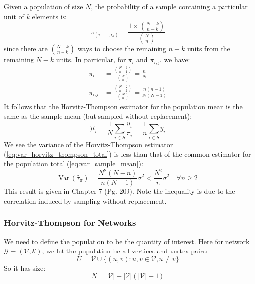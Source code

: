\documentclass{article}
\begin{document}
\begin{example}\label{ex:srs}
   Given a population of size $N$, the probability of a sample containing a particular unit of $k$ elements is:
    \begin{equation*}
        \pi_{(i_1, \ldots, i_k)} = \frac{1 \times \binom{N-k}{n-k}}{\binom{N}{n}}
    \end{equation*}
    since there are $\binom{N-k}{n-k}$ ways to choose the remaining $n-k$ units from the remaining $N-k$ units.  
    In particular, for $\pi_i$ and $\pi_{i,j}$, we have:
    \begin{align*}
        \pi_i &= \frac{\binom{N-1}{n-1}}{\binom{N}{n}} = \frac{n}{N}\\
        \pi_{i,j} &= \frac{\binom{N-2}{n-2}}{\binom{N}{n}} = \frac{n(n-1)}{N(N-1)}
    \end{align*}
    It follows that the Horvitz-Thompson estimator for the population mean is the same as the sample mean (but sampled without replacement):
    \begin{equation*}
        \hat{\mu}_{\pi} = \frac{1}{N}\sum_{i\in S} \frac{y_i}{\pi_i} = \frac{1}{n}\sum_{i\in S} y_i
    \end{equation*}
    We see the variance of the Horvitz-Thompson estimator (\ref{eq:var_horvitz_thompson_total}) is less than that of the common estimator for the population total (\ref{eq:var_sample_mean}):
    \begin{equation*}
        \mathrm{Var}\,(\hat{\tau}_{\pi})=\frac{N^{2}(N-n)}{n(N-1)}\sigma^{2}<\frac{N^{2}}{n}\sigma^{2} \quad \forall n \geq 2
    \end{equation*}
    This result is given in \citep{alma990199486190107026} Chapter 7 (Pg. 209). Note the inequality is due to the correlation induced by sampling without replacement.
\end{example}

\subsubsection{Horvitz-Thompson for Networks}

We need to define the population to be the quantity of interest. Here for network ${\mathcal{G}}=(\mathcal{V},{\mathcal{E}})$, we let the population be all vertices and vertex pairs:
\begin{equation*}
    U=\mathcal{V}\cup \{(u,v):u,v\in \mathcal{V}, u\neq v\}
\end{equation*}
So it has size:
\begin{equation*}
    N=|\mathcal{V}|+|\mathcal{V}|(|\mathcal{V}|-1)
\end{equation*}
\end{document}
